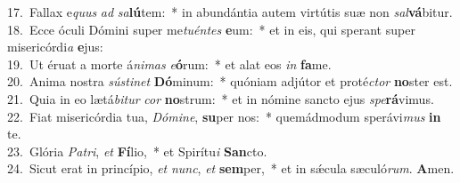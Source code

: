 {17.~}Fallax e\textit{quus} \textit{ad} \textit{sa}\textbf{lú}tem:~* in abundántia autem virtútis suæ non \textit{sal}\textbf{vá}bitur.\\
{18.~}Ecce óculi Dómini super me\textit{tu}\textit{én}\textit{tes} \textbf{e}um:~* et in eis, qui sperant super misericórdi\textit{a} \textbf{e}jus:\\
{19.~}Ut éruat a morte á\textit{ni}\textit{mas} \textit{e}\textbf{ó}rum:~* et alat eos \textit{in} \textbf{fa}me.\\
{20.~}Anima nostra \textit{sú}\textit{sti}\textit{net} \textbf{Dó}minum:~* quóniam adjútor et proté\textit{ctor} \textbf{no}ster est.\\
{21.~}Quia in eo lætá\textit{bi}\textit{tur} \textit{cor} \textbf{no}strum:~* et in nómine sancto ejus \textit{spe}\textbf{rá}vimus.\\
{22.~}Fiat misericórdia tua, \textit{Dó}\textit{mi}\textit{ne}, \textbf{su}per nos:~* quemádmodum sperávi\textit{mus} \textbf{in} te.\\
{23.~}Glória \textit{Pa}\textit{tri}, \textit{et} \textbf{Fí}lio,~* et Spirítu\textit{i} \textbf{San}cto.\\
{24.~}Sicut erat in princípio, \textit{et} \textit{nunc}, \textit{et} \textbf{sem}per,~* et in sǽcula sæculó\textit{rum}. \textbf{A}men.\\
